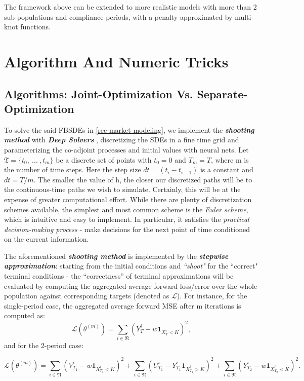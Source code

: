 \documentclass[a4paper,10pt]{article}
\newcommand{\1}{\mathbf{1}}
\begin{document}
The framework above can be extended to more realistic models with more
than 2 sub-populations and compliance periods, with a penalty approximated
by multi-knot functions.

\section{Algorithm And Numeric
Tricks}

\subsection{Algorithms: Joint-Optimization Vs.
Separate-Optimization}

To solve the said FBSDEs in \ref{rec-market-modeling}, we
implement the \textbf{\emph{shooting method}} with \emph{\textbf{Deep Solvers}}
\cite{JH}, discretizing the SDEs in a fine time grid and parameterizing the
co-adjoint processes and initial values with neural nets. Let
\(\mathfrak{T}=\lbrace{t_0,~...~, t_m \rbrace}\) be a discrete set of
points with \(t_0=0\) and \(T_m=T\), where m is the number of time
steps. Here the step size \(dt=(t_i-t_{i-1})\) is a constant and
\(dt=T/m\). The smaller the value of h, the closer our discretized paths
will be to the continuous-time paths we wish to simulate. Certainly,
this will be at the expense of greater computational effort. While there
are plenty of discretization schemes available, the simplest and most
common scheme is the \emph{Euler scheme}, which is intuitive and easy to
implement. In particular, it satisfies the \emph{practical
decision-making process} - make decisions for the next point of time
conditioned on the current information.

The aforementioned \textbf{\emph{shooting method}} is implemented by the
\textbf{\textit{stepwise approximation}}: starting from the initial conditions and
\emph{``shoot"} for the ``correct" terminal conditions - the
``correctness'' of terminal approximations will be evaluated by
computing the aggregated average forward loss/error over the whole
population against corresponding targets (denoted as \(\mathcal{L}\)).
For instance, for the single-period case, the aggregated average forward
MSE after m iterations is computed as: \[
\mathcal{L}(\theta^{(m)})= \sum_{i\in\mathfrak{N}}(Y_{T}^i-w\mathbf{1}_{X_{T}^i<K})^2,
\] and for the 2-period case:

\[
\mathcal{L}(\theta^{(m)})= \sum_{i\in\mathfrak{N}}(V_{T_1}^i-w\mathbf{1}_{X_{T_1}^i<K})^2 + \sum_{i\in\mathfrak{N}}(U_{T_1}^i-Y_{T_1}^i\mathbf{1}_{X_{T_1}^i>K})^2 + \sum_{i\in\mathfrak{N}}(Y_{T_2}^i-w\mathbf{1}_{X_{T_2}^i<K})^2.
\]
\end{document}
